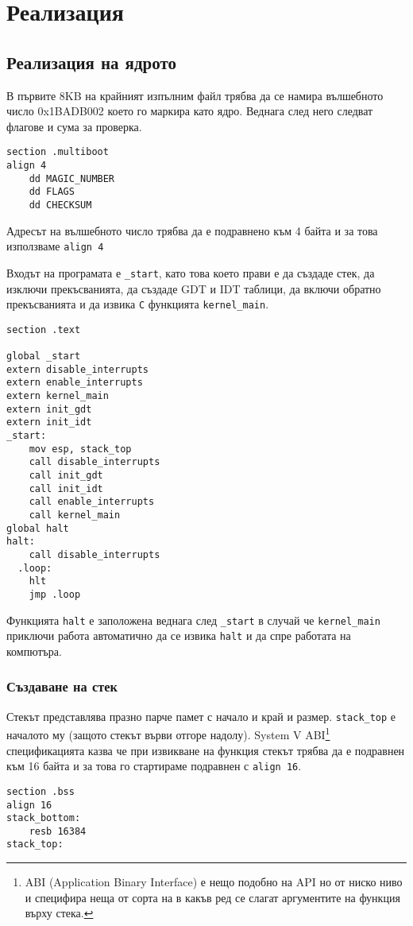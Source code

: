 \section{Реализация}
\subsection{Реализация на ядрото}
В първите 8KB на крайният изпълним файл трябва да се намира вълшебното число 0x1BADB002 което го маркира като ядро. Веднага след него следват флагове и сума за проверка.
\begin{lstlisting}
section .multiboot
align 4
    dd MAGIC_NUMBER
    dd FLAGS
    dd CHECKSUM
\end{lstlisting}                                                                                                                                 Адресът на вълшебното число трябва да е подравнено към 4 байта и за това използваме {\tt align 4}

Входът на програмата е {\tt \_start}, като това което прави е да създаде стек, да изключи прекъсванията, да създаде GDT и IDT таблици, да включи обратно прекъсванията и да извика {\tt C} функцията {\tt kernel\_main}.
\begin{lstlisting}
section .text

global _start
extern disable_interrupts
extern enable_interrupts
extern kernel_main
extern init_gdt
extern init_idt
_start:
    mov esp, stack_top
    call disable_interrupts
    call init_gdt
    call init_idt
    call enable_interrupts
    call kernel_main
global halt
halt:
    call disable_interrupts
  .loop:
    hlt
    jmp .loop
\end{lstlisting}
Функцията {\tt halt} е заположена веднага след {\tt \_start} в случай че {\tt kernel\_main} приключи работа автоматично да се извика {\tt halt} и да спре работата на компютъра.

\subsubsection{Създаване на стек}
Стекът представлява празно парче памет с начало и край и размер. {\tt stack\_top} е началото му (защото стекът върви отгоре надолу). System V ABI\footnote{ABI (Application Binary Interface) е нещо подобно на API но от ниско ниво и специфира неща от сорта на в какъв ред се слагат аргументите на функция върху стека.} спецификацията казва че при извикване на функция стекът трябва да е подравнен към 16 байта и за това го стартираме подравнен с {\tt align 16}.
\begin{lstlisting}
section .bss
align 16
stack_bottom:
    resb 16384
stack_top:
\end{lstlisting}


